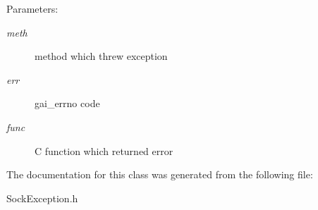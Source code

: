 \begin{Desc}
\item[Parameters:]
\begin{description}
\item[{\em meth}]method which threw exception \item[{\em err}]gai\_\-errno code \item[{\em func}]C function which returned error \end{description}
\end{Desc}


The documentation for this class was generated from the following file:\begin{CompactItemize}
\item 
SockException.h\end{CompactItemize}
